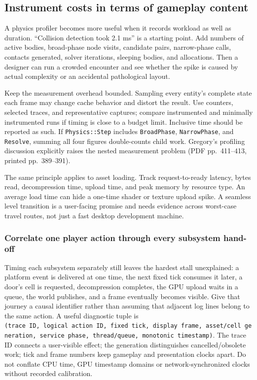 \subsection{Instrument costs in terms of gameplay content}\label{06-engine-ii-ch041-instrument-costs-in-terms-of-gameplay-content}

A physics profiler becomes more useful when it records workload as well as duration. ``Collision detection took 2.1 ms'' is a starting point. Add numbers of active bodies, broad-phase node visits, candidate pairs, narrow-phase calls, contacts generated, solver iterations, sleeping bodies, and allocations. Then a designer can run a crowded encounter and see whether the spike is caused by actual complexity or an accidental pathological layout.

Keep the measurement overhead bounded. Sampling every entity's complete state each frame may change cache behavior and distort the result. Use counters, selected traces, and representative captures; compare instrumented and minimally instrumented runs if timing is close to a budget limit. Inclusive time should be reported as such. If \texttt{Physics::Step} includes \texttt{BroadPhase}, \texttt{NarrowPhase}, and \texttt{Resolve}, summing all four figures double-counts child work. Gregory's profiling discussion explicitly raises the nested measurement problem (PDF pp.~411--413, printed pp.~389--391).

The same principle applies to asset loading. Track request-to-ready latency, bytes read, decompression time, upload time, and peak memory by resource type. An average load time can hide a one-time shader or texture upload spike. A seamless level transition is a user-facing promise and needs evidence across worst-case travel routes, not just a fast desktop development machine.

\subsubsection{Correlate one player action through every subsystem hand-off}\label{06-engine-ii-ch041-correlate-one-player-action-through-every-subsystem-hand-off}

Timing each subsystem separately still leaves the hardest stall unexplained: a platform event is delivered at one time, the next fixed tick consumes it later, a door's cell is requested, decompression completes, the GPU upload waits in a queue, the world publishes, and a frame eventually becomes visible. Give that journey a causal identifier rather than assuming that adjacent log lines belong to the same action. A useful diagnostic tuple is \texttt{(trace\ ID,\ logical\ action\ ID,\ fixed\ tick,\ display\ frame,\ asset/cell\ generation,\ service\ phase,\ thread/queue,\ monotonic\ timestamp)}. The trace ID connects a user-visible effect; the generation distinguishes cancelled/obsolete work; tick and frame numbers keep gameplay and presentation clocks apart. Do not conflate CPU time, GPU timestamp domains or network-synchronized clocks without recorded calibration.

